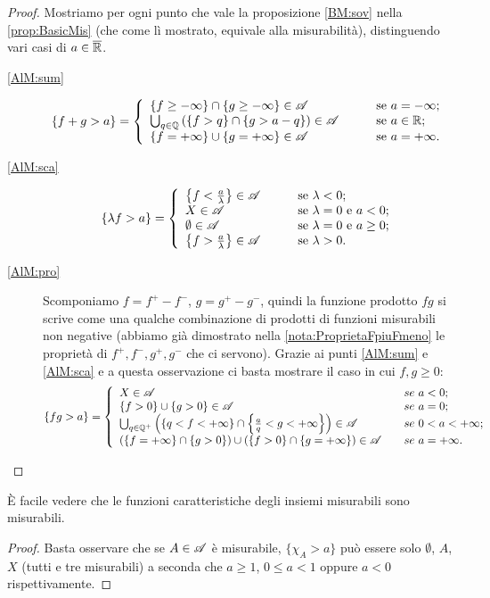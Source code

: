 \begin{proof}
	Mostriamo per ogni punto che vale la proposizione \ref{BM:sov} nella \cref{prop:BasicMis} (che come lì mostrato, equivale alla misurabilità),
	distinguendo vari casi di $a\in \overline{\mathbb R}$.
	\begin{description}
	\item[\ref{AlM:sum}]
	\[
		\{f+g>a\}=\left\{\begin{array}{ll}
			\{f\ge -\infty\}\cap\{g\ge -\infty\}\in \A &\qquad \text{se}\ a=-\infty;\\
			\bigcup_{q\in \Q}\left(\{f>q\}\cap\{g>a-q\}\right)\in \A &\qquad \text{se}\ a\in \R;\\
			\{f=+\infty\}\cup\{g=+\infty\}\in \A &\qquad \text{se}\ a=+\infty.
		\end{array}\right.
	\]
	\item[\ref{AlM:sca}]
	\[
		\{\lambda f>a\}=\left\{\begin{array}{ll}
			\left\{f<\frac{a}{\lambda}\right\}\in \A &\qquad \text{se}\ \lambda<0;\\
			X \in \A &\qquad \text{se}\ \lambda=0\ \text{e}\ a< 0;\\
			\emptyset \in \A &\qquad \text{se}\ \lambda=0\ \text{e}\ a\ge 0;\\
			\left\{f>\frac{a}{\lambda}\right\}\in \A &\qquad \text{se}\ \lambda>0.
		\end{array}\right.
	\]
	\item[\ref{AlM:pro}] Scomponiamo $f=f^+ - f^-$, $g=g^+- g^-$, quindi la funzione prodotto $fg$ si scrive come una qualche combinazione di prodotti di funzioni misurabili non negative (abbiamo già dimostrato nella \cref{nota:ProprietaFpiuFmeno} le proprietà di $f^+,f^-,g^+,g^-$ che ci servono). Grazie ai punti \ref{AlM:sum} e \ref{AlM:sca} e a questa osservazione ci basta mostrare il caso in cui $f,g\ge0$:
	\[
		\{fg>a\}=\left\{\begin{array}{ll}
			X\in \mathscr A &\quad se\ a<0;\\
			\{f>0\}\cup\{g>0\}\in \mathscr A &\quad se\ a=0;\\
			\bigcup_{q\in \mathbb Q^+}\left(\{q<f<+\infty\}\cap\left\{\frac{a}{q}<g<+\infty \right\} \right)\in \mathscr A &\quad se\ 0<a<+\infty;\\
			(\{f=+\infty\}\cap\{g>0\})\cup (\{f>0\}\cap\{g=+\infty\})\in \mathscr A &\quad se\ a=+\infty.
		\end{array}\right.
	\]
	\end{description}
\end{proof}

\begin{remark}\label{nota:CarMis}
	È facile vedere che le funzioni caratteristiche degli insiemi misurabili sono misurabili.
\end{remark}
\begin{proof}
	Basta osservare che se $A\in \mathscr A$ è misurabile, $\{ \chi_A > a\}$ può essere solo $\emptyset$, $A$, $X$ (tutti e tre misurabili) a seconda che
	$a\ge 1$, $0\le a< 1$ oppure $a < 0$ rispettivamente.
\end{proof}

